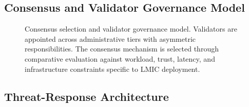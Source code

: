 \documentclass[AMA,LATO1COL]{WileyNJD-v2}
\begin{document}
\subsection{Consensus and Validator Governance Model}\label{subsec:consensus}

\begin{figure}[!ht]
\centering
{}
\caption{Consensus selection and validator governance model. Validators are appointed across administrative tiers with asymmetric responsibilities. The consensus mechanism is selected through comparative evaluation against workload, trust, latency, and infrastructure constraints specific to LMIC deployment.}\label{fig:consensus}
\end{figure}
%
%
%
%
%
%
%

\subsection{Threat-Response Architecture}\label{subsec:threats}
\end{document}
